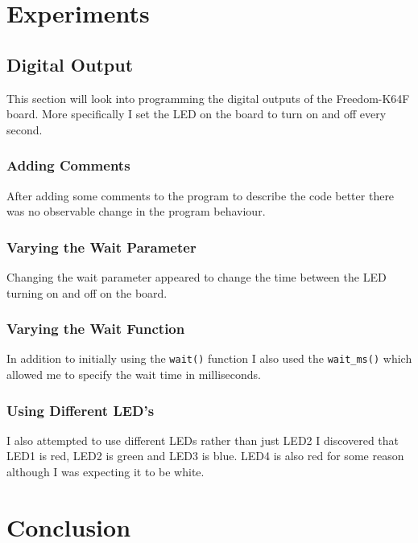 \documentclass[a4paper,12pt]{scrartcl}
\begin{document}
	\section{Experiments}
	{
		\subsection{Digital Output}
		{
			This section will look into programming the digital outputs of the Freedom-K64F board. More specifically I set the LED on the board to turn on and off every second.
			\subsubsection{Adding Comments}
			{
				After adding some comments to the program to describe the code better there was no observable change in the program behaviour. 
			}
			\subsubsection{Varying the Wait Parameter}
			{
				Changing the wait parameter appeared to change the time between the LED turning on and off on the board.
			}
			\subsubsection{Varying the Wait Function}
			{
				In addition to initially using the \lstinline|wait()| function I also used the \lstinline|wait_ms()| which allowed me to specify the wait time in milliseconds.
			}
			\subsubsection{Using Different LED's}
			{
				I also attempted to use different LEDs rather than just LED2 I discovered that LED1 is red, LED2 is green and LED3 is blue. LED4 is also red for some reason although I was expecting it to be white.
			}
		}
	}

	\section{Conclusion}
	{
	
	}
	
	\newpage
	
	\printbibliography[heading=bibintoc,title=References]
\end{document}
